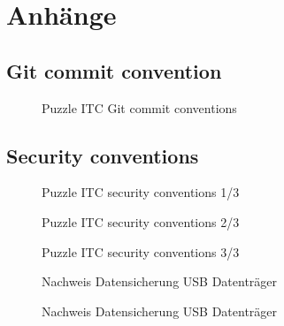 \chapter{Anhänge}

\section{Git commit convention}
\label{sec:gitconv}
\begin{figure}[h]
    \centering
    \caption{Puzzle ITC Git commit conventions}
    \end{figure}

\section{Security conventions}
\label{sec:secconv}
\begin{figure}[h]
    \centering
    \caption{Puzzle ITC security conventions 1/3}
\end{figure}

\begin{figure}[h]
    \centering
    \caption{Puzzle ITC security conventions 2/3 }
\end{figure}  

\begin{figure}[h]
    \centering
    \caption{Puzzle ITC security conventions 3/3}
\end{figure}  
\label{sec:datsec}

\label{sec:savusb}
\begin{figure}[h]
    \centering
    \caption{Nachweis Datensicherung USB Datenträger}
\end{figure}

\label{sec:savgit}
\begin{figure}[h]
    \centering
    \caption{Nachweis Datensicherung USB Datenträger}
\end{figure}





